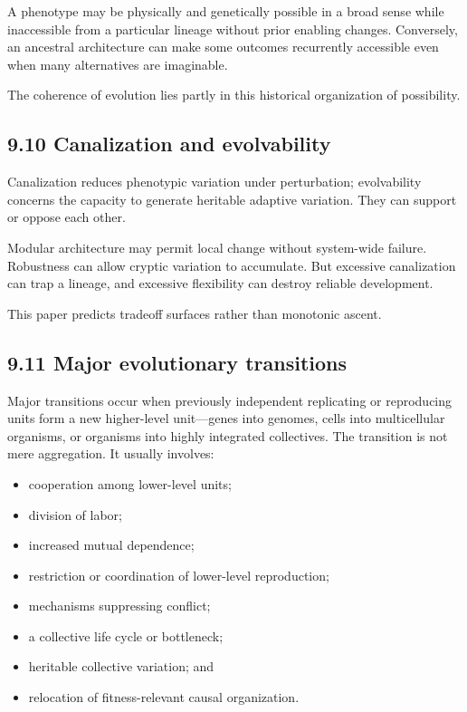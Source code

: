 \documentclass[
  11pt,
]{article}
\providecommand{\tightlist}{%
  \setlength{\itemsep}{0pt}\setlength{\parskip}{0pt}}
\begin{document}
A phenotype may be physically and genetically possible in a broad sense
while inaccessible from a particular lineage without prior enabling
changes. Conversely, an ancestral architecture can make some outcomes
recurrently accessible even when many alternatives are imaginable.

The coherence of evolution lies partly in this historical organization
of possibility.

\subsection{9.10 Canalization and
evolvability}\label{canalization-and-evolvability}

Canalization reduces phenotypic variation under perturbation;
evolvability concerns the capacity to generate heritable adaptive
variation. They can support or oppose each other.

Modular architecture may permit local change without system-wide
failure. Robustness can allow cryptic variation to accumulate. But
excessive canalization can trap a lineage, and excessive flexibility can
destroy reliable development.

This paper predicts tradeoff surfaces rather than monotonic ascent.

\subsection{9.11 Major evolutionary
transitions}\label{major-evolutionary-transitions}

Major transitions occur when previously independent replicating or
reproducing units form a new higher-level unit---genes into genomes,
cells into multicellular organisms, or organisms into highly integrated
collectives. The transition is not mere aggregation. It usually
involves:

\begin{itemize}
\tightlist
\item
  cooperation among lower-level units;
\item
  division of labor;
\item
  increased mutual dependence;
\item
  restriction or coordination of lower-level reproduction;
\item
  mechanisms suppressing conflict;
\item
  a collective life cycle or bottleneck;
\item
  heritable collective variation; and
\item
  relocation of fitness-relevant causal organization.
\end{itemize}
\end{document}
